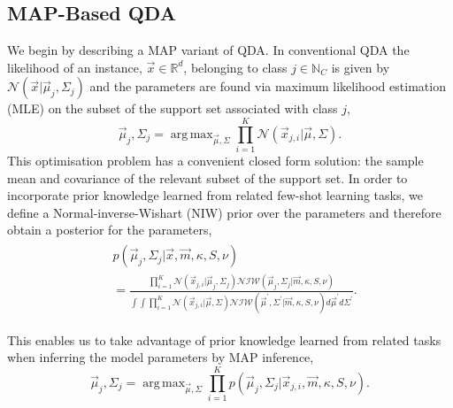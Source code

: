 \documentclass[10pt,twocolumn,letterpaper]{article}
\newcommand{\NIW}{\mathcal{NIW}}
\newcommand{\Gauss}{\mathcal{N}}
\DeclareMathOperator*{\argmax}{arg\,max}
\begin{document}
\subsection{MAP-Based QDA}\label{sec:mqdaMAP}
\label{sec:method}
We begin by describing a MAP variant of QDA. In conventional QDA the likelihood of an instance, $\vec x \in \mathbb{R}^d$, belonging to class $j \in \mathbb{N}_C$ is given by $\Gauss(\vec x | \vec \mu_j, \Sigma_j)$
and the parameters are found via maximum likelihood estimation (MLE) on the subset of the support set associated with class $j$,
\begin{equation}
    \vec \mu_j, \Sigma_j = \argmax_{\vec \mu, \Sigma} \prod_{i=1}^K \Gauss(\vec x_{j,i} | \vec \mu, \Sigma).
\end{equation}
This optimisation problem has a convenient closed form solution: the sample mean and covariance of the relevant subset of the support set. In order to incorporate prior knowledge learned from related few-shot learning tasks, we define a Normal-inverse-Wishart (NIW) prior \cite{murphy2012machine} over the parameters and therefore obtain a posterior for the parameters,
\begin{align}
\begin{split}
    &p(\vec \mu_j, \Sigma_j | \vec x, \vec m, \kappa, S, \nu) \\
    &= \frac{\prod_{i=1}^K\Gauss(\vec x_{j,i} | \vec \mu_j, \Sigma_j) \NIW(\vec \mu_j, \Sigma_j | \vec m, \kappa, S, \nu)}{\int \int \prod_{i=1}^K\Gauss(\vec x_{j,i} | \vec \mu, \Sigma) \NIW(\vec \mu^\prime, \Sigma^\prime | \vec m, \kappa, S, \nu) d\vec \mu^\prime d\Sigma^\prime}.
\end{split}
\end{align}

This enables us to take advantage of prior knowledge learned from related tasks when inferring the model parameters by MAP inference,
\begin{equation}
    \vec \mu_j, \Sigma_j = \argmax_{\vec \mu, \Sigma} \prod_{i=1}^K p(\vec \mu_j, \Sigma_j | \vec x_{j,i}, \vec m, \kappa, S, \nu).
\end{equation}
\end{document}
